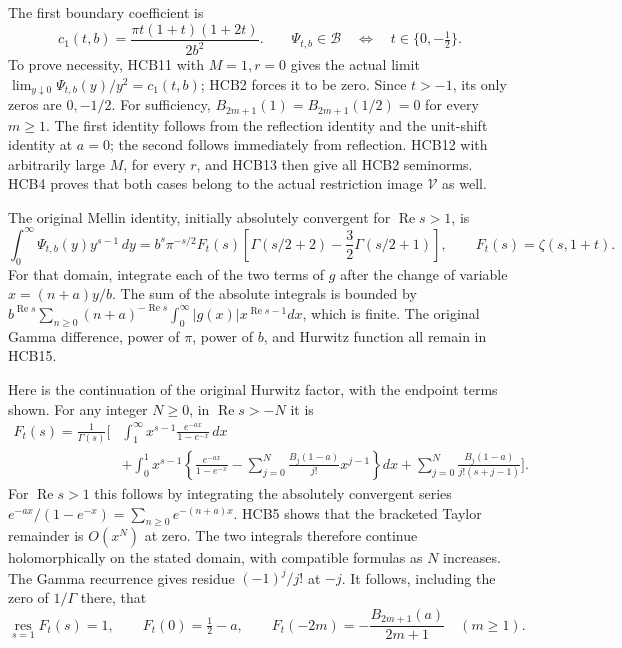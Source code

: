 The first boundary coefficient is
\begin{equation}\tag{HCB14}
 c_1(t,b)=\frac{\pi t(1+t)(1+2t)}{2b^2}.
 \qquad
 \Psi_{t,b}\in\mathcal B
       \quad\Longleftrightarrow\quad t\in\{0,-\tfrac12\}.
\end{equation}
To prove necessity, HCB11 with $M=1,r=0$ gives the actual limit
$\lim_{y\downarrow0}\Psi_{t,b}(y)/y^2=c_1(t,b)$; HCB2 forces it
to be zero. Since $t>-1$, its only zeros are $0,-1/2$. For
sufficiency, $B_{2m+1}(1)=B_{2m+1}(1/2)=0$ for every $m\geq1$.
The first identity follows from the reflection identity and the
unit-shift identity at $a=0$; the second follows immediately from
reflection. HCB12 with arbitrarily large $M$, for every $r$, and
HCB13 then give all HCB2 seminorms. HCB4 proves that both cases
belong to the actual restriction image $\mathcal V$ as well.

The original Mellin identity, initially absolutely convergent for
$\operatorname{Re}s>1$, is
\begin{equation}\tag{HCB15}
 \int_0^\infty\Psi_{t,b}(y)y^{s-1}\,dy
 =b^s\pi^{-s/2}F_t(s)
       \left[\Gamma(s/2+2)-\frac32\Gamma(s/2+1)\right],
 \qquad F_t(s)=\zeta(s,1+t).
\end{equation}
For that domain, integrate each of the two terms of $g$ after
the change of variable $x=(n+a)y/b$. The sum of the absolute
integrals is bounded by
$b^{\operatorname{Re}s}\sum_{n\geq0}(n+a)^{-\operatorname{Re}s}
\int_0^\infty|g(x)|x^{\operatorname{Re}s-1}dx$, which is finite.
The original Gamma difference, power of $\pi$, power of $b$, and
Hurwitz function all remain in HCB15.

Here is the continuation of the original Hurwitz factor, with the
endpoint terms shown. For any integer $N\geq0$, in
$\operatorname{Re}s>-N$ it is
\begin{equation}\tag{HCB16}
\begin{split}
 F_t(s)=\frac1{\Gamma(s)}\bigg[&
 \int_1^\infty x^{s-1}\frac{e^{-a x}}{1-e^{-x}}\,dx\\
 &+\int_0^1x^{s-1}\left\{\frac{e^{-a x}}{1-e^{-x}}
             -\sum_{j=0}^N\frac{B_j(1-a)}{j!}x^{j-1}\right\}dx
 +\sum_{j=0}^N\frac{B_j(1-a)}{j!(s+j-1)}\bigg].
\end{split}
\end{equation}
For $\operatorname{Re}s>1$ this follows by integrating the absolutely
convergent series $e^{-a x}/(1-e^{-x})=\sum_{n\geq0}e^{-(n+a)x}$.
HCB5 shows that the bracketed Taylor remainder is $O(x^N)$ at
zero. The two integrals therefore continue holomorphically on the
stated domain, with compatible formulas as $N$ increases.
The Gamma recurrence gives residue $(-1)^j/j!$ at $-j$. It follows,
including the zero of $1/\Gamma$ there, that
\begin{equation}\tag{HCB17}
 \operatorname*{res}_{s=1}F_t(s)=1,\qquad
 F_t(0)=\tfrac12-a,\qquad
 F_t(-2m)=-\frac{B_{2m+1}(a)}{2m+1}\quad(m\geq1).
\end{equation}

